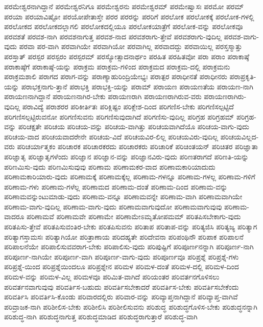 {ಪರಮೇಶ್ವರನಾಗಿದ್ದಾನೆ
ಪರಮೇಶ್ವರನಿಗೂ
ಪರಮೇಶ್ವರನು
ಪರಮೇಶ್ವರಮ್
ಪರಮೇಷ್ವಾಸಃ
ಪರಮೋ
ಪರಮ್
ಪರಯಾ
ಪರಯಾವಿಷ್ಟೋ
ಪರಯೋಪೇತಾಸ್ತೇ
ಪರರ
ಪರರನ್ನು
ಪರರಿಗೆ
ಪರಲೋಕ
ಪರಲೋಕಕ್ಕೆ
ಪರಲೋಕ-ಗಳಲ್ಲಿ
ಪರಲೋಕದ
ಪರಲೋಕದಲ್ಲಾಗಲಿ
ಪರಲೋಕದಲ್ಲಿಯೂ
ಪರಲೋಕಯಾತ್ರೆಗೆ
ಪರಲೋಕ-ವನ್ನು
ಪರಲೋಕವೂ
ಪರವಶತೆ
ಪರವಶ-ನಾಗಿ
ಪರವಶನಾಗುತ್ತ
ಪರವಶ-ನಾದ
ಪರವಶರಾಗು-ತ್ತೇವೆ
ಪರವಶರಾಗು-ವುದಿಲ್ಲ
ಪರವಶ-ವಾಗು-ವುದು
ಪರವಾ
ಪರ-ವಾಗಿ
ಪರವಾಗಿಯೇ
ಪರವಾಗಿಯೋ
ಪರವಾಗಿಲ್ಲ
ಪರವಾದದ್ದು
ಪರವಾಯಿಲ್ಲ
ಪರಸ್ತಸ್ಮಾತ್ತು
ಪರಸ್ತಾತ್
ಪರಸ್ಪರ
ಪರಸ್ಪರಂ
ಪರಸ್ಪರಮ್
ಪರಸ್ಯೋತ್ಸಾದನಾರ್ಥಂ
ಪರಹಿತ
ಪರಹಿತವೋ
ಪರಾ
ಪರಾಂ
ಪರಾಕಾಷ್ಠೆ
ಪರಾಕಾಷ್ಠೆಗೆ
ಪರಾಕಾಷ್ಠೆ-ಯನ್ನು
ಪರಾಕ್ರಮ
ಪರಾಕ್ರಮ-ಗಳಿಂದ
ಪರಾಕ್ರಮದ
ಪರಾಕ್ರಮ-ದಲ್ಲಿ
ಪರಾಕ್ರಮನು
ಪರಾಕ್ರಮಶಾಲಿ
ಪರಾಗದ
ಪರಾಗ-ವನ್ನು
ಪರಾಣ್ಯಾಹುರಿಂದ್ರಿಯೇಭ್ಯಃ
ಪರಾತ್ಪರ
ಪರಾಧೀನತೆ
ಪರಾಧೀನರು
ಪರಾಪ್ರಕೃತಿ-ಯನ್ನು
ಪರಾಭಕ್ತನಾಗು-ತ್ತಾನೆ
ಪರಾಭಕ್ತಿ
ಪರಾಭಕ್ತಿ-ಯನ್ನು
ಪರಾಮ್
ಪರಾಯಣ
ಪರಾಯಣತೆಯ
ಪರಾಯಣ-ನಾಗಿ
ಪರಾಯಣನಾಗಿದ್ದಾನೆ
ಪರಾಯಣನಾಗಿರ-ಬೇಕು
ಪರಾಯಣರಾಗಿ
ಪರಾಯಣರಾಗಿರುವ-ವರು
ಪರಾಯಣರಾಗಿರು-ವುದಿಲ್ಲ
ಪರಾವಿದ್ಯೆ
ಪರಾಶರರ
ಪರಿಕೀರ್ತಿತಃ
ಪರಿಕ್ಲಿಷ್ಟಂ
ಪರಿಕ್ಲೇಶ-ದಿಂದ
ಪರಿಗಣಿಸ-ಬೇಕು
ಪರಿಗಣಿಸಲ್ಪಟ್ಟಿದೆ
ಪರಿಗಣಿಸಲ್ಪಟ್ಟಿರುವನೋ
ಪರಿಗಣಿಸುವನು
ಪರಿಗಣಿಸುವುದಾಗಿದೆ
ಪರಿಗಣಿಸು-ವುದಿಲ್ಲ
ಪರಿಗ್ರಹ
ಪರಿಗ್ರಹಮ್
ಪರಿಗ್ರಹ-ವನ್ನು
ಪರಿಚಕ್ಷತೇ
ಪರಿಚಯ
ಪರಿಚಯ-ವನ್ನು
ಪರಿಚಯ-ವಾಗಿತ್ತು
ಪರಿಚಯವಾಗಿದೆಯೊ
ಪರಿಚಯ-ವಾಗು-ವುದು
ಪರಿಚಯ-ವಾದ
ಪರಿಚಯವಾದರೇನೇ
ಪರಿಚಯ-ವಿದೆ
ಪರಿಚಯವಿರ-ಲಿಲ್ಲ
ಪರಿಚಯವಿರು-ವುದಿಲ್ಲ
ಪರಿಚಯವಿಲ್ಲದ-ವರು
ಪರಿಚರ್ಯಾತ್ಮಕಂ
ಪರಿಚಾರಕ
ಪರಿಚಾರಕರದು
ಪರಿಚಾರಕರು
ಪರಿಚಾರಿಕೆ
ಪರಿಚಿಂತಯನ್
ಪರಿಚಿತರ
ಪರಿಜ್ಞಾತಾ
ಪರಿಜ್ಞಾತೃ
ಪರಿಜ್ಞಾತೃಗಳೆಂದು
ಪರಿಜ್ಞಾನ
ಪರಿಜ್ಞಾನ-ವನ್ನು
ಪರಿಜ್ಞಾನವಿರು-ವುದು
ಪರಿಣತರಾಗದೆ
ಪರಿಣತಿ-ಯನ್ನು
ಪರಿಣಮಿಸು-ವುದು
ಪರಿಣಮಿಸುವುವು
ಪರಿಣಾಮ
ಪರಿಣಾಮಕರ-ವಾದ
ಪರಿಣಾಮಕಾರಿಯಾದುದು
ಪರಿಣಾಮಕಾರಿಯಾರು-ವುದು
ಪರಿಣಾಮಕ್ಕೆ
ಪರಿಣಾಮಕ್ಕೆಲ್ಲ
ಪರಿಣಾಮ-ಗಳನ್ನೂ
ಪರಿಣಾಮ-ಗಳಲ್ಲ
ಪರಿಣಾಮ-ಗಳಿಗೆ
ಪರಿಣಾಮ-ಗಳು
ಪರಿಣಾಮ-ಗಳೆಲ್ಲ
ಪರಿಣಾಮದ
ಪರಿಣಾಮ-ದಂತೆ
ಪರಿಣಾಮ-ದಿಂದ
ಪರಿಣಾಮ-ವನ್ನು
ಪರಿಣಾಮವನ್ನುಂಟುಮಾಡು-ವುದು
ಪರಿಣಾಮ-ವನ್ನೂ
ಪರಿಣಾಮವನ್ನೇ
ಪರಿಣಾಮ-ವಾಗಿ
ಪರಿಣಾಮವಾಗಿಯೇ
ಪರಿಣಾಮ-ವಾಗು-ವುದಿಲ್ಲ
ಪರಿಣಾಮ-ವಾಗು-ವುದು
ಪರಿಣಾಮವಾಗುವುದೋ
ಪರಿಣಾಮವಾಗುವುವು
ಪರಿಣಾಮ-ವಾದರೂ
ಪರಿಣಾಮವೆ
ಪರಿಣಾಮವೇ
ಪರಿಣಾಮೇ
ಪರಿಣಾಮೇಽಮೃತೋಪಮಮ್
ಪರಿತಪಿಸಬೇಕಾಗು-ವುದು
ಪರಿತಪಿಸು-ತ್ತೇವೆ
ಪರಿತಪಿಸುವಂತಿರ-ಬೇಕು
ಪರಿತಪಿಸುವನು
ಪರಿತಾಪ
ಪರಿತಾಪ-ವನ್ನು
ಪರಿತ್ಯಜಿಸಿ
ಪರಿತ್ಯಜ್ಯ
ಪರಿತ್ಯಾಗ
ಪರಿತ್ಯಾಗಸ್ತಾಮಸಃ
ಪರಿತ್ಯಾಗಿಯೋ
ಪರಿತ್ರಾಣಾಯ
ಪರಿದಹ್ಯತೇ
ಪರಿದೇವನಾ
ಪರಿಪಂಥಿನೌ
ಪರಿಪಾಕ
ಪರಿಪಾಲನೆ
ಪರಿಪಾಲನೆಯೇ
ಪರಿಪಾಲಿಸುವವರಾಗ-ಬೇಕು
ಪರಿಪಾಲಿಸು-ವುದು
ಪರಿಪುಷ್ಟಿಗೆ
ಪರಿಪೂರ್ಣನನ್ನಾಗಿ
ಪರಿಪೂರ್ಣ-ನಾಗಿ
ಪರಿಪೂರ್ಣ-ನಾಗಿಯೇ
ಪರಿಪೂರ್ಣ-ವಾಗಿ
ಪರಿಪೂರ್ಣ-ವಾಗು-ವುದು
ಪರಿಪೂರ್ಣವೂ
ಪರಿಪ್ರಶ್ನೆ
ಪರಿಪ್ರಶ್ನೆ-ಗಳು
ಪರಿಪ್ರಶ್ನೆ-ಯಿಂದ
ಪರಿಪ್ರಶ್ನೆಯಿಂದಲೂ
ಪರಿಪ್ರಶ್ನೇನ
ಪರಿಮಳ
ಪರಿಮಳ-ದಂತೆ
ಪರಿಮಳ-ದಲ್ಲಿ
ಪರಿಮಳ-ದಿಂದ
ಪರಿಮಳ-ವನ್ನು
ಪರಿಮಳ-ವಿಲ್ಲ
ಪರಿಮಳವೂ
ಪರಿಮಿತ-ವಾಗಿದೆ
ಪರಿಯಂತರ
ಪರಿವರ್ತನಗೊಳಿಸಲು
ಪರಿವರ್ತನವಾಗುವುವು
ಪರಿವರ್ತಿಸ-ಬಹುದು
ಪರಿವರ್ತಿಸಬೇಕಾದರೆ
ಪರಿವರ್ತಿಸ-ಬೇಕು
ಪರಿವರ್ತಿಸಬೇಕೆಂದು
ಪರಿವರ್ತಿಸಿ
ಪರಿವರ್ತಿಸಿ-ಕೊಂಡು
ಪರಿವಾರದಲ್ಲಿರು
ಪರಿವಾರ-ವನ್ನು
ಪರಿವ್ಯಾಪ್ತನಾಗಿದ್ದಾನೆ
ಪರಿವ್ಯಾಪ್ತ-ವಾಗಿವೆ
ಪರಿವ್ರಾಜಕ-ನಾಗಿ
ಪರಿಶೀಲಿಸ-ಬೇಕು
ಪರಿಶೀಲಿಸಿ
ಪರಿಶೀಲಿಸುವನು
ಪರಿಶುದ್ಧ
ಪರಿಶುದ್ಧಗೊಳಿಸ-ಬೇಕು
ಪರಿಶುದ್ಧನನ್ನಾಗಿ
ಪರಿಶುದ್ಧ-ನಾಗಿ
ಪರಿಶುದ್ಧನಾಗುತ್ತ
ಪರಿಶುದ್ಧಮಾಡಿದ
ಪರಿಶುದ್ಧರಾಗುತ್ತಾರೆ
ಪರಿಶುದ್ಧ-ವಾಗಿ
}
